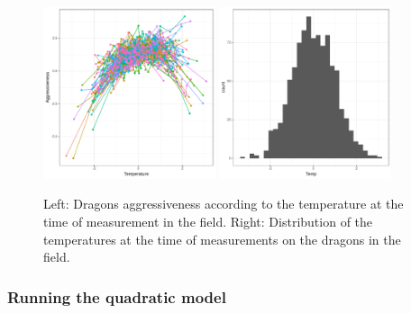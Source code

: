\documentclass[a4paper,12pt,twoside]{article}
\begin{document}
\begin{figure}[h!b!]
  \centering
  \includegraphics[width = 0.45\textwidth]{Aggressiveness_continuous.pdf}
  \includegraphics[width = 0.45\textwidth]{Distribution_Temp_continuous.pdf}
  \caption{Left: Dragons aggressiveness according to the temperature at the time of measurement in the field. Right: Distribution of the temperatures at the time of measurements on the dragons in the field.}
  \label{fig_agr_rn_plain_ct}
\end{figure}

\subsubsection{Running the quadratic model}
\end{document}
